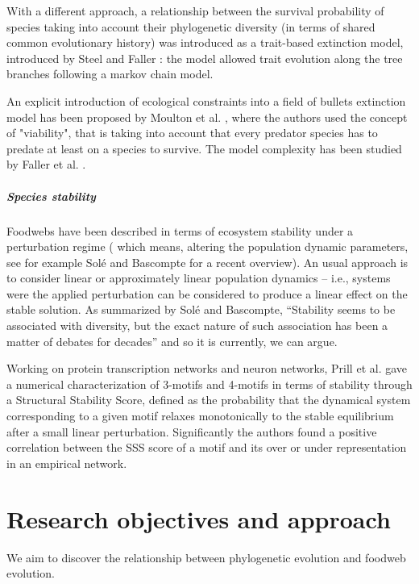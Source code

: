 \documentclass[12pt,a4paper]{report}
\begin{document}
With a different approach, a relationship between the survival probability of species taking into account their phylogenetic diversity (in terms of shared common evolutionary history) was introduced as a trait-based extinction model, introduced by Steel and Faller \cite{steel2009markovian, faller2012trait}: the model allowed trait evolution along the tree branches following a markov chain model.

An explicit introduction of ecological constraints into a field of bullets extinction model has been proposed by Moulton et al. \cite{moulton2007optimizing}, where the authors used the concept of "viability", that is taking into account that every predator species has to predate at least on a species to survive. The model complexity has been studied by Faller et al. \cite{faller2011optimizing}.

\paragraph{Species stability}
Foodwebs have been described in terms of ecosystem stability under a perturbation regime ( which means, altering the population dynamic parameters, see for example Sol\'{e} and Bascompte \cite{sole2006self} for a recent overview). An usual approach is to consider linear or approximately linear population dynamics -- i.e., systems were the applied perturbation can be considered to produce a linear effect on the stable solution. As summarized by Sol\'{e} and Bascompte, ``Stability seems to be associated with diversity, but the exact nature of such association has been a matter of debates for decades'' and so it is currently, we can argue.

Working on protein transcription networks and neuron networks, Prill et al. \cite{prill2005dynamic} gave a numerical characterization of 3-motifs and 4-motifs in terms of stability through a Structural Stability Score, defined as the probability that the dynamical system corresponding to a given motif relaxes monotonically to the stable equilibrium after a small linear perturbation. Significantly the authors found a positive correlation between the SSS score of a motif and its over or under representation in an empirical network.

\chapter{Research objectives and approach}

We aim to discover the relationship between phylogenetic evolution and foodweb evolution.
\end{document}
